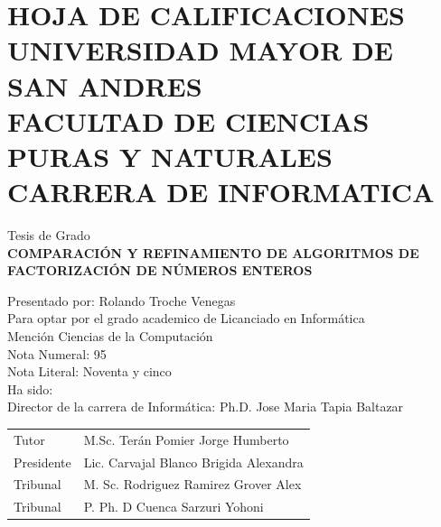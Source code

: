 \chapter*{\centering \normalsize 
HOJA DE CALIFICACIONES\\
UNIVERSIDAD MAYOR DE SAN ANDRES\\
FACULTAD DE CIENCIAS PURAS Y NATURALES\\
CARRERA DE INFORMATICA\\ }
\begin{center}
    Tesis de Grado\\
    \textbf{COMPARACIÓN Y REFINAMIENTO DE ALGORITMOS DE FACTORIZACIÓN DE NÚMEROS ENTEROS}\\
\end{center}

\begin{flushleft}
Presentado por: Rolando Troche Venegas\\
Para optar por el grado academico de Licanciado en Informática\\
Mención Ciencias de la Computación\\

Nota Numeral: 95 \\
Nota Literal: Noventa y cinco \\
Ha sido: \\

Director de la carrera de Informática: Ph.D. Jose Maria Tapia Baltazar\\

\begin{tabular}{l l}
Tutor & M.Sc. Terán Pomier Jorge Humberto\\
Presidente & Lic. Carvajal Blanco Brigida Alexandra\\
Tribunal & M. Sc. Rodriguez Ramirez Grover Alex\\
Tribunal & P. Ph. D Cuenca Sarzuri Yohoni\\
\end{tabular}
\end{flushleft}

